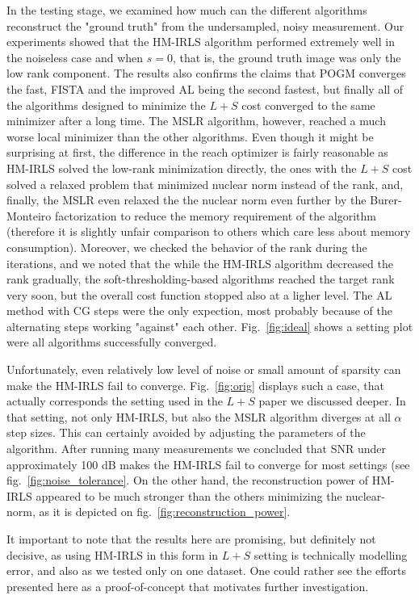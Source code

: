 In the testing stage, we examined how much can the different algorithms reconstruct the "ground truth" from the undersampled, noisy measurement. Our experiments showed that the HM-IRLS algorithm performed extremely well in the noiseless case and when $s = 0$, that is, the ground truth image was only the low rank component. The results also confirms the claims that POGM converges the fast, FISTA and the improved AL being the second fastest, but finally all of the algorithms designed to minimize the $L+S$ cost converged to the same minimizer after a long time. The MSLR algorithm, however, reached a much worse local minimizer than the other algorithms. Even though it might be surprising at first, the difference in the reach optimizer is fairly reasonable as HM-IRLS solved the low-rank minimization directly, the ones with the $L+S$ cost solved a relaxed problem that minimized nuclear norm instead of the rank, and, finally, the MSLR even relaxed the the nuclear norm even further by the Burer-Monteiro factorization to reduce the memory requirement of the algorithm (therefore it is slightly unfair comparison to others which care less about memory consumption). Moreover, we checked the behavior of the rank during the iterations, and we noted that the while the HM-IRLS algorithm decreased the rank gradually, the soft-thresholding-based algorithms reached the target rank very soon, but the overall cost function stopped also at a ligher level. The AL method with CG steps were the only expection, most probably because of the alternating steps working "against" each other. Fig.~\ref{fig:ideal} shows a setting plot were all algorithms successfully converged.

Unfortunately, even relatively low level of noise or small amount of sparsity can make the HM-IRLS fail to converge. Fig.~\ref{fig:orig} displays such a case, that actually corresponds the setting used in the $L+S$ paper we discussed deeper. In that setting, not only HM-IRLS, but also the MSLR algorithm diverges at all $\alpha$ step sizes. This can certainly avoided by adjusting the parameters of the algorithm. After running many measurements we concluded that SNR under approximately 100 dB makes the HM-IRLS fail to converge for most settings (see fig.~\ref{fig:noise_tolerance}. On the other hand, the reconstruction power of HM-IRLS appeared to be much stronger than the others minimizing the nuclear-norm, as it is depicted on fig.~\ref{fig:reconstruction_power}.

It important to note that the results here are promising, but definitely not decisive, as using HM-IRLS in this form in $L+S$ setting is technically modelling error, and also as we tested only on one dataset. One could rather see the efforts presented here as a proof-of-concept that motivates further investigation.


